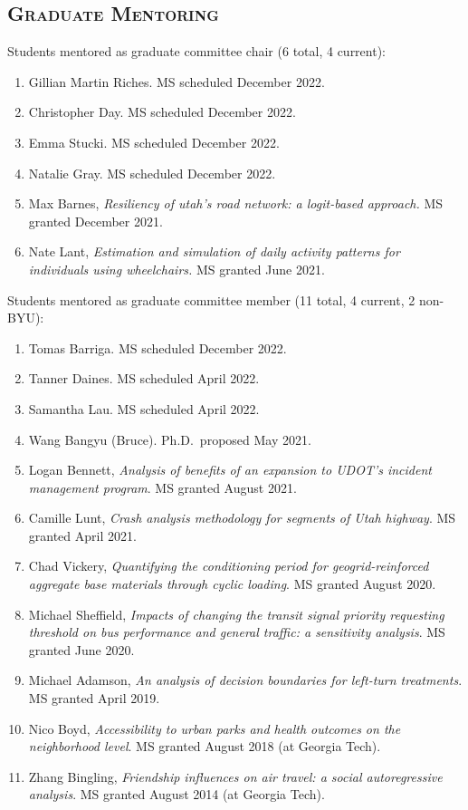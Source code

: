 \documentclass[margin,line]{res}
\newcounter{enuminitialize}
\newenvironment{myenum}[1][]
{%
 \setcounter{enuminitialize}{#1}
 \addtocounter{enuminitialize}{2}
 \begin{enumerate}[left= 4pt, itemsep=12pt, start=\value{enuminitialize}, label=\arabic*\addtocounter{enumi}{-2}]
}
{%
 \end{enumerate}
}
\newcommand{\secfont}{\scshape }
\begin{document}
\begin{resume}
\section{\secfont Graduate Mentoring}
Students mentored as graduate committee chair (6 total, 4 current):
\vspace{0.3cm}
\begin{myenum}[6]
  \item Gillian Martin Riches. MS scheduled December 2022.
  \item Christopher Day. MS scheduled December 2022.
  \item Emma Stucki. MS scheduled December 2022.
  \item Natalie Gray. MS scheduled December 2022.
  \item Max Barnes, \textit{Resiliency of utah's road network: a logit-based approach.} MS granted December 2021.
  \item Nate Lant, \textit{Estimation and simulation of daily activity patterns for individuals using wheelchairs.} MS granted June 2021.
\end{myenum}

Students mentored as graduate committee member (11 total, 4 current, 2 non-BYU):
\vspace{0.3cm}
\begin{myenum}[11]
  \item Tomas Barriga. MS scheduled December 2022.
  \item Tanner Daines. MS scheduled April 2022.
  \item Samantha Lau. MS scheduled April 2022.
  \item Wang Bangyu (Bruce). Ph.D.\ proposed May 2021.
  \item Logan Bennett, \textit{Analysis of benefits of an expansion to UDOT’s incident management program}. MS granted August 2021.
  \item Camille Lunt, \textit{Crash analysis methodology for segments of Utah highway}. MS granted April 2021.
  \item Chad Vickery, \textit{Quantifying the conditioning period for geogrid-reinforced aggregate base materials through cyclic loading}. MS granted August 2020.
  \item Michael Sheffield, \textit{Impacts of changing the transit signal priority requesting threshold on bus performance and general traffic: a sensitivity analysis}. MS granted June 2020.
  \item Michael Adamson, \textit{An analysis of decision boundaries for left-turn treatments}. MS granted April 2019.
  \item Nico Boyd, \textit{Accessibility to urban parks and health outcomes on the neighborhood level}. MS granted August 2018 (at Georgia Tech).
  \item Zhang Bingling, \textit{Friendship influences on air travel: a social autoregressive analysis}. MS granted August 2014 (at Georgia Tech).
\end{myenum}



\end{resume}
\end{document}
